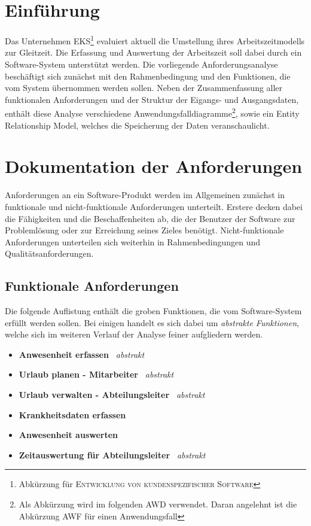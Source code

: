 \chapter{Einführung}
Das Unternehmen \textsc{EKS}\footnote{Abkürzung für \textsc{Entwicklung von kundenspezifischer Software}} evaluiert aktuell die Umstellung ihres Arbeitszeitmodells zur Gleitzeit. Die Erfassung und Auswertung der Arbeitszeit soll dabei durch ein Software-System unterstützt werden. Die vorliegende Anforderungsanalyse beschäftigt sich zunächst mit den Rahmenbedingung und den Funktionen, die vom System übernommen werden sollen. Neben der Zusammenfassung aller funktionalen Anforderungen und der Struktur der Eigangs- und Ausgangsdaten, enthält diese Analyse verschiedene Anwendungsfalldiagramme\footnote{Als Abk\"urzung wird im folgenden \textsc{AWD} verwendet. Daran angelehnt ist die Abk\"urzung \textsc{AWF} f\"ur einen Anwendungsfall}, sowie ein Entity Relationship Model, welches die Speicherung der Daten veranschaulicht.

\chapter{Dokumentation der Anforderungen}
Anforderungen an ein Software-Produkt werden im Allgemeinen zunächst in funktionale und nicht-funktionale Anforderungen unterteilt. Erstere decken dabei die Fähigkeiten und die Beschaffenheiten ab, die der Benutzer der Software zur Problemlösung oder zur Erreichung seines Zieles benötigt. Nicht-funktionale Anforderungen unterteilen sich weiterhin in Rahmenbedingungen und Qualitätsanforderungen.

\section{Funktionale Anforderungen}
Die folgende Auflistung enth\"alt die groben Funktionen, die vom Software-System erf\"ullt werden sollen. Bei einigen handelt es sich dabei um \textit{abstrakte Funktionen}, welche sich im weiteren Verlauf der Analyse feiner aufgliedern werden.

\begin{itemize}
	\item \textbf{Anwesenheit erfassen} \textit{\guillemotleft \ abstrakt \ \guillemotright}
	\item \textbf{Urlaub planen - Mitarbeiter} \textit{\guillemotleft \ abstrakt \ \guillemotright}
	\item \textbf{Urlaub verwalten - Abteilungsleiter} \textit{\guillemotleft \ abstrakt \ \guillemotright}
	\item \textbf{Krankheitsdaten erfassen}
	\item \textbf{Anwesenheit auswerten}
	\item \textbf{Zeitauswertung f\"ur Abteilungsleiter} \textit{\guillemotleft \ abstrakt \ \guillemotright}
\end{itemize} 

